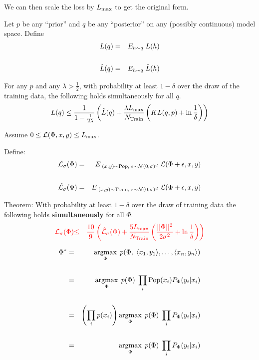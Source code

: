 {\vfill
We can then scale the loss by $L_{\max}$ to get the original form.


Let $p$ be any ``prior'' and $q$ be any ``posterior'' on any  (possibly continuous) model space.
Define
\begin{eqnarray*}
  L(q) & =  &E_{h \sim q}\;L(h) \\
  \\
  \hat{L}(q) & =  &E_{h \sim q}\;\hat{L}(h)
\end{eqnarray*}


\vfill
For any $p$ and any $\lambda > \frac{1}{2}$, with probability
at least $1-\delta$ over the draw of the training data, the following holds simultaneously for all $q$.
\vfill
$$L(q) \leq \frac{1}{1-\frac{1}{2\lambda}}\left(\hat{L}(q) + \frac{\lambda L_{\max}}{N_\mathrm{Train}}\left(KL(q,p) + \ln \frac{1}{\delta}\right)\right)$$


Assume $0 \leq {\cal L}(\Phi,x,y) \leq L_{\max}$.

\vfill
Define:
\begin{eqnarray*}
{\cal L}_\sigma(\Phi) & = & E_{\;(x,y)\sim \mathrm{Pop},\;\epsilon \sim {\cal N}(0,\sigma)^d}\;{{\cal L}(\Phi+\epsilon,x,y)} \\
\\
\hat{{\cal L}}_\sigma(\Phi) & = & E_{\;(x,y)\sim \mathrm{Train},\;\epsilon \sim {\cal N}(0,\sigma)^d}\;{{\cal L}(\Phi+\epsilon,x,y)} \\
\end{eqnarray*}

\vfill
Theorem: With probability at least $1-\delta$ over the draw of training data the following holds {\bf simultaneously} for all $\Phi$.
\begin{eqnarray*}
   {\color{red} {\cal L}_\sigma(\Phi)} & {\color{red} \leq} & {\color{red} \frac{10}{9}\left(\hat{{\cal L}}_\sigma(\Phi)
   + \frac{5 L_{\max}}{N_\mathrm{Train}}\left(\frac{||\Phi||^2}{2\sigma^2} + \ln \frac{1}{\delta}\right)\right)}
\end{eqnarray*}


\vfill
{\huge
\begin{eqnarray*}
\Phi^* & = & \operatorname*{argmax}_\Phi\;p(\Phi,\;{\mbox{$\langle x_1,y_1\rangle$}},\ldots,{\mbox{$\langle x_n,y_n\rangle$}}) \\
\\
 & = & \operatorname*{argmax}_\Phi \; p(\Phi)\;\prod_i \mathrm{Pop}(x_i)P_\Phi(y_i|x_i) \\
 \\
  & = & \left(\prod_i p(x_i)\right) \operatorname*{argmax}_\Phi \; p(\Phi)\;\prod_i  P_\Phi(y_i|x_i) \\
 \\
  & = & \operatorname*{argmax}_\Phi \; p(\Phi)\;\prod_i P_\Phi(y_i|x_i)
 \end{eqnarray*}
}

}
